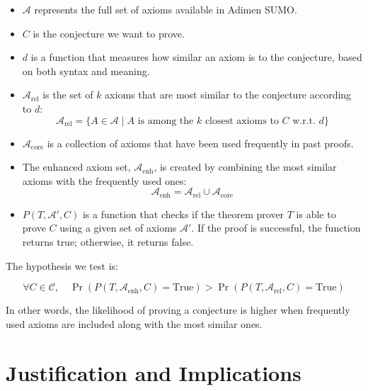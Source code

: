 \documentclass[english,version-2020-11]{uzl-thesis}
\begin{document}
\begin{itemize}
    \item \( \mathcal{A} \) represents the full set of axioms available in Adimen SUMO.
    \item \( C \) is the conjecture we want to prove.
    \item \( d \) is a function that measures how similar an axiom is to the conjecture, based on both syntax and meaning.
    \item \( \mathcal{A}_{\text{rel}} \) is the set of \( k \) axioms that are most similar to the conjecture according to \( d \):
    \begin{equation}
        \mathcal{A}_{\text{rel}} = \{ A \in \mathcal{A} \mid A \text{ is among the } k \text{ closest axioms to } C \text{ w.r.t. } d \}
    \end{equation}
    \item \( \mathcal{A}_{\text{core}} \) is a collection of axioms that have been used frequently in past proofs.
    \item The enhanced axiom set, \( \mathcal{A}_{\text{enh}} \), is created by combining the most similar axioms with the frequently used ones:
    \begin{equation}
        \mathcal{A}_{\text{enh}} = \mathcal{A}_{\text{rel}} \cup \mathcal{A}_{\text{core}}
    \end{equation}
    \item \( P(T, \mathcal{A}', C) \) is a function that checks if the theorem prover \( T \) is able to prove \( C \) using a given set of axioms \( \mathcal{A}' \). If the proof is successful, the function returns true; otherwise, it returns false.
\end{itemize}

The hypothesis we test is:

\begin{equation}
    \forall C \in \mathcal{C}, \quad \Pr(P(T, \mathcal{A}_{\text{enh}}, C) = \text{True}) > \Pr(P(T, \mathcal{A}_{\text{rel}}, C) = \text{True})
\end{equation}

In other words, the likelihood of proving a conjecture is higher when frequently used axioms are included along with the most similar ones.


\section{Justification and Implications}
\end{document}
